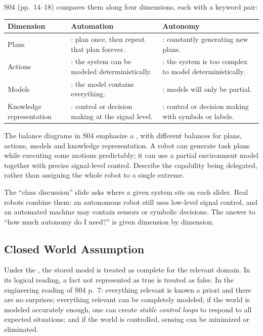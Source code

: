 S04 (pp.~14--18) compares them along four dimensions, each with a keyword pair:
\par\smallskip\begin{tabularx}{\linewidth}{@{}L{27mm}YY@{}}
\toprule
Dimension & Automation & Autonomy \\
\midrule
Plans & : plan once, then repeat that plan forever. & : constantly generating new plans. \\
Actions & : the system can be modeled deterministically. & : the system is too complex to model deterministically. \\
Models & : the model contains everything. & : models will only be partial. \\
Knowledge representation & : control or decision making at the signal level. & : control or decision making with symbols or labels. \\
\bottomrule
\end{tabularx}\par\smallskip

The balance diagrams in S04 emphasize a , with different balances for plans, actions, models and knowledge representation. A robot can generate task plans while executing some motions predictably; it can use a partial environment model together with precise signal-level control. Describe the capability being delegated, rather than assigning the whole robot to a single extreme.

The ``class discussion'' slide asks where a given system sits on each slider. Real robots combine them: an autonomous robot still uses low-level signal control, and an automated machine may contain sensors or symbolic decisions. The answer to ``how much autonomy do I need?'' is given dimension by dimension.

\subsection{Closed World Assumption}
Under the , the stored model is treated as complete for the relevant domain. In its logical reading, a fact not represented as true is treated as false. In the engineering reading of S04 p.~7: everything relevant is known a priori and there are no surprises; everything relevant can be completely modeled; if the world is modeled accurately enough, one can create \emph{stable control loops} to respond to all expected situations; and if the world is controlled, sensing can be minimized or eliminated.

